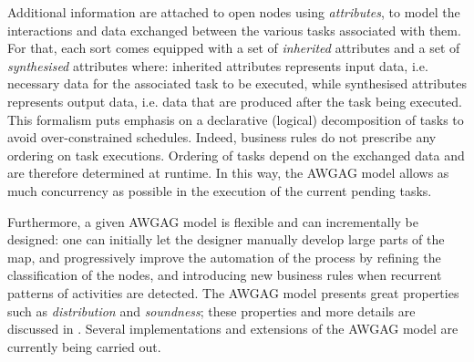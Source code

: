 Additional information are attached to open nodes using \textit{attributes}, to model the interactions and data exchanged between the various tasks associated with them. For that, each sort comes equipped with a set of \textit{inherited} attributes and a set of \textit{synthesised} attributes where: inherited attributes represents input data, i.e. necessary data for the associated task to be executed, while synthesised attributes represents output data, i.e. data that are produced after the task being executed. This formalism puts emphasis on a declarative (logical) decomposition of tasks to avoid over-constrained schedules. Indeed, business rules do not prescribe any ordering on task executions. Ordering of tasks depend on the exchanged data and are therefore determined at runtime. In this way, the AWGAG model allows as much concurrency as possible in the execution of the current pending tasks.

Furthermore, a given AWGAG model is flexible and can incrementally be designed: one can initially let the designer manually develop large parts of the map, and progressively improve the automation of the process by refining the classification of the nodes, and introducing new business rules when recurrent patterns of activities are detected. The AWGAG model presents great properties such as \textit{distribution} and \textit{soundness}; these properties and more details are discussed in \cite{badouel2015active}. Several implementations and extensions of the AWGAG model are currently being carried out.




